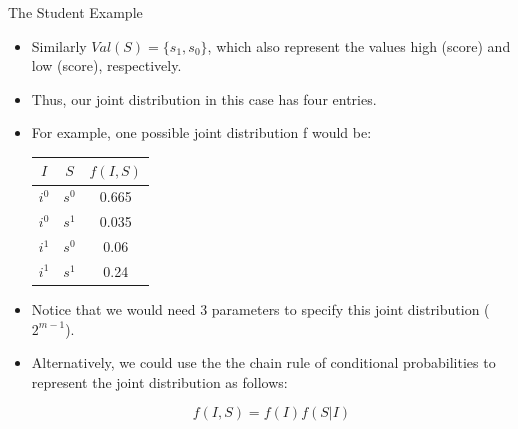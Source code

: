 \documentclass[handout]{beamer}
\begin{document}
\begin{frame}{The Student Example}
\scriptsize{
\begin{itemize}

\item Similarly $Val(S) = \{s_1 , s_0 \}$, which
also represent the values high (score) and low (score), respectively.

\item Thus, our joint distribution in this case has four entries. 
\item For example, one possible joint distribution f would be:

\begin{table}
\centering
  \begin{tabular}{cc|c} \hline
$I$ & $S$ & $f(I,S)$  \\ \hline
$i^0$ & $s^0$ & 0.665 \\
$i^0$ & $s^1$ & 0.035 \\
$i^1$ & $s^0$ & 0.06 \\
$i^1$ & $s^1$ & 0.24 
\end{tabular} 
\end{table}

\item Notice that we would need 3 parameters to specify this joint distribution ($2^{m-1}$).

\item Alternatively, we could use the the chain rule of conditional probabilities to represent the joint distribution as follows:

\begin{displaymath}
 f(I,S) = f(I)f(S|I)
\end{displaymath}

\end{itemize}



} 

\end{frame}
\end{document}
